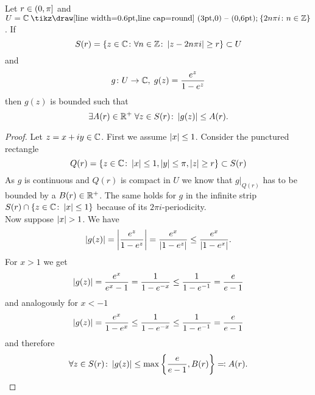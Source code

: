 \begin{lemma}
	Let $r \in \left(0, \pi\right]$ and $U = \field{C} \mysetminus \fbr{2 n \pi i \colon n \in \field{Z}}$. If
\begin{equation*}
	S(r) = \left\{z \in \mathbb{C} \colon \forall n \in \mathbb{Z} \colon \left|z - 2 n \pi i\right| \geq r\right\} \subset U
\end{equation*}
	and
\begin{equation*}
	g \colon U \to \mathbb{C}, \; g(z) = \frac{e^z}{1 - e^z}
\end{equation*}
	then $g(z)$ is bounded such that
\begin{equation*}
	\exists A(r) \in \mathbb{R}^+ \; \forall z \in S(r) \colon \left|g(z)\right| \leq A(r).
\end{equation*}
\end{lemma}
\begin{proof}
	Let $z = x + i y \in \mathbb{C}$. First we assume $\left|x\right| \leq 1$. Consider the punctured rectangle
\begin{equation*}
	Q(r) = \left\{z \in \mathbb{C} \colon \left|x\right| \leq 1, \left|y\right| \leq \pi, \left|z\right| \geq r\right\} \subset S(r)
\end{equation*}
	As $g$ is continuous and $Q(r)$ is compact in $U$ we know that $g \big\vert _{Q(r)}$ has to be bounded by a $B(r) \in \mathbb{R}^+$. The same holds for $g$ in the infinite strip $S(r) \cap \left\{z \in \mathbb{C} \colon \left|x\right| \leq 1\right\}$ because of its $2 \pi i$-periodicity. \\
	Now suppose $\left|x\right| > 1$. We have
\begin{equation*}
	\left|g(z)\right| = \left|\frac{e^z}{1 - e^z}\right| = \frac{e^x}{\left|1 - e^z\right|} \leq \frac{e^x}{\left|1 - e^x\right|}.
\end{equation*}
	For $x > 1$ we get
\begin{equation*}
	\left|g(z)\right| = \frac{e^x}{e^x - 1} = \frac{1}{1 - e^{-x}} \leq \frac{1}{1 - e^{-1}} = \frac{e}{e - 1}
\end{equation*}
	and analogously for $x < -1$ 
\begin{equation*}
	\left|g(z)\right| = \frac{e^x}{1 - e^x} \leq \frac{1}{1 - e^{-x}} \leq \frac{1}{1 - e^{-1}} = \frac{e}{e - 1}
\end{equation*}
	and therefore
\begin{equation*}
	\forall z \in S(r) \colon \left|g(z)\right| \leq \max \left\{\frac{e}{e - 1}, B(r)\right\} \eqqcolon A(r).
\end{equation*}
\end{proof}


